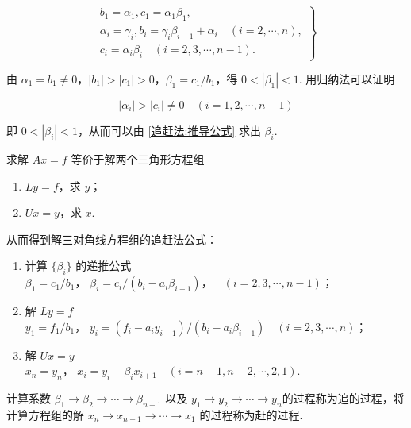 \begin{equation}
    \left.\begin{matrix}
        b_1 = \alpha_1, c_1 = \alpha_1\beta_1,                                            \\
        \alpha_i = \gamma_i, b_i = \gamma_i\beta_{i-1} + \alpha_i\quad(i = 2, \cdots, n), \\
        c_i = \alpha_i\beta_i\quad(i=2,3,\cdots,n-1).
    \end{matrix}\right\}
    \label{追赶法:推导公式}
\end{equation}

由 $\alpha_1 = b_1 \neq 0$，$\left|b_1\right| > \left|c_1\right| > 0$，$\beta_1 = c_1 / b_1$，得 $0 < \left|\beta_1\right| < 1$. 用归纳法可以证明

\[ \left|\alpha_i\right| > \left|c_i\right| \neq 0\quad(i=1,2, \cdots, n - 1)\]

即 $0 < \left|\beta_i\right| < 1$，从而可以由 \eqref{追赶法:推导公式} 求出 $\beta_i$.

求解 $Ax=f$ 等价于解两个三角形方程组

\begin{enumerate}
    \item $Ly=f$，求 $y$；
    \item $Ux=y$，求 $x$.
\end{enumerate}

从而得到解三对角线方程组的追赶法公式：

\begin{enumerate}
    \item 计算 $\{\beta_i\}$ 的递推公式 \\
          $\beta_1 = c_1 / b_1$，
          $\beta_i = c_i / (b_i - a_i\beta_{i-1})$，$\quad(i=2,3,\cdots,n-1)$；
    \item 解 $Ly = f$ \\
          $y_1 = f_1 / b_1$，
          $y_i = (f_i - a_iy_{i-1}) / (b_i - a_i\beta_{i-1})\quad(i=2,3,\cdots,n)$；
    \item 解 $Ux = y$ \\
          $x_n = y_n$，
          $x_i = y_i - \beta_ix_{i+1}\quad(i=n-1,n-2,\cdots,2,1)$.
\end{enumerate}

计算系数 $\beta_1 \rightarrow \beta_2 \rightarrow \cdots \rightarrow \beta_{n-1}$ 以及 $y_1 \rightarrow y_2 \rightarrow \cdots \rightarrow y_n$的过程称为追的过程，将计算方程组的解 $x_n \rightarrow x_{n-1} \rightarrow \cdots \rightarrow x_1$ 的过程称为赶的过程.
